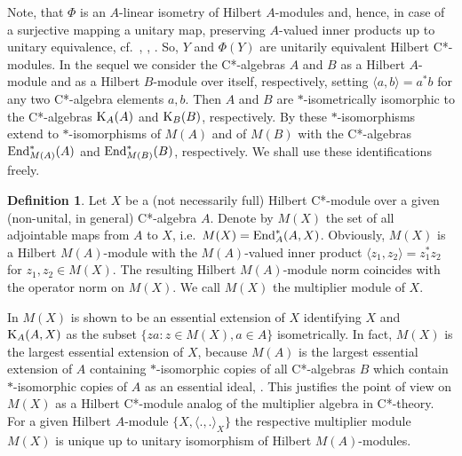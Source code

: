\documentclass{amsart}
\theoremstyle{definition}
\newtheorem{dfn}[thm]{Definition}
\begin{document}
Note, that $\Phi$ is an $A$-linear isometry of Hilbert $A$-modules and, hence, in case of a surjective mapping a unitary map, preserving $A$-valued inner products up to unitary equivalence, cf.~\cite{Lance_1994}, \cite[Thm. 5]{F_1997}, \cite[Thm. 1.1]{Solel_2001}. So, $Y$ and $\Phi(Y)$ are unitarily equivalent Hilbert C*-modules. In the sequel we consider the C*-algebras $A$ and $B$ as a Hilbert $A$-module and as a Hilbert $B$-module over itself, respectively, setting $\langle a,b \rangle = a^*b$ for any two C*-algebra elements $a,b$. Then $A$ and $B$ are $*$-isometrically isomorphic to the C*-algebras ${\rm K}_A(A)$ and ${\rm K}_B(B)$, respectively. By \cite[Prop.~2.2.16]{Wegge-Olsen} these $*$-isomorphisms extend to $*$-isomorphisms of $M(A)$ and of $M(B)$ with the C*-algebras ${\rm End}_{M(A)}^*(A)$ and ${\rm End}_{M(B)}^*(B)$, respectively. We shall use these identifications freely. 

\begin{dfn} \label{dfn_multmod}
Let $X$ be a (not necessarily full) Hilbert C*-module over a given (non-unital, in general) C*-algebra $A$. Denote by $M(X)$ the set of all adjointable maps from $A$ to $X$, i.e.~$M(X) ={\rm End}_A^*(A,X)$. Obviously, $M(X)$ is a Hilbert $M(A)$-module with the $M(A)$-valued inner product $\langle z_1,z_2 \rangle = z_1^*z_2$ for $z_1, z_2 \in M(X)$. The resulting Hilbert $M(A)$-module norm coincides with the operator norm on $M(X)$. We call $M(X)$ the multiplier module of $X$. 
\end{dfn}

In \cite{BG_2004} $M(X)$ is shown to be an essential extension of $X$ identifying $X$ and ${\rm K}_A(A,X)$ as the subset $\{ za : z \in M(X), a \in A \}$ isometrically. In fact, $M(X)$ is the largest essential extension of $X$, because $M(A)$ is the largest essential extension of $A$ containing $*$-isomorphic copies of all C*-algebras $B$ which contain $*$-isomorphic copies of $A$ as an essential ideal, \cite[Thm.~1.2]{BG_2004}. This justifies the point of view on $M(X)$ as a Hilbert C*-module analog of the multiplier algebra in C*-theory. For a given Hilbert $A$-module $\{ X, \langle .,. \rangle_X \}$ the respective multiplier module $M(X)$ is unique up to unitary isomorphism of Hilbert $M(A)$-modules. 
\end{document}
